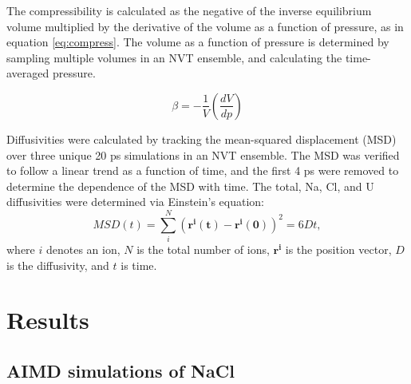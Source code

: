 \documentclass[preprint,3p,10pt,onecolumn,number,sort&compress]{elsarticle}
\begin{document}
The compressibility is calculated as the negative of the inverse equilibrium volume multiplied by the derivative of the volume as a function of pressure, as in equation \ref{eq:compress}. The volume as a function of pressure is determined by sampling multiple volumes in an NVT ensemble, and calculating the time-averaged pressure. 

\begin{equation}
\label{eq:compress}
\beta = -\frac{1}{V} {\left(\frac{dV}{dp}\right)}
\end{equation}

Diffusivities were calculated by tracking the mean-squared displacement (MSD) over three unique 20 ps simulations in an NVT ensemble. The MSD was verified to follow a linear trend as a function of time, and the first 4 ps were removed to determine the dependence of the MSD with time. The total, Na, Cl, and U diffusivities were determined via Einstein's equation:
\begin{equation}
MSD(t)=\sum_i^N (\mathbf{r^i(t)} - \mathbf{r^i(0)})^2 =6Dt,
\end{equation}
where $i$ denotes an ion, $N$ is the total number of ions, $\mathbf{r^i}$ is the position vector, $D$ is the diffusivity, and $t$ is time. 






\section{Results}
\label{sec:results}
\subsection{AIMD simulations of NaCl}
\end{document}
